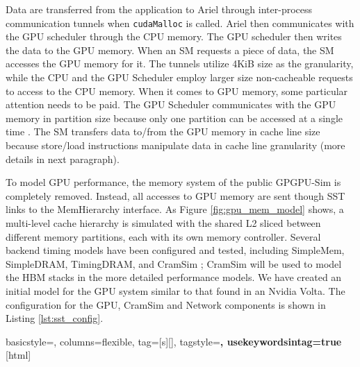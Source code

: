 Data are transferred from the application to Ariel through
inter-process communication tunnels when \texttt{cudaMalloc} is called. 
Ariel then communicates with the GPU scheduler through
the CPU memory. The GPU scheduler then writes the data to the GPU memory. When an SM
requests a piece of data, the SM accesses the GPU memory for it.
The tunnels utilize 4KiB size as the granularity, while the CPU and the GPU Scheduler
employ larger size non-cacheable requests to access to the CPU memory. When it comes to
GPU memory, some particular attention needs to be paid. The GPU Scheduler communicates with 
the GPU memory in partition size because only one partition can be accessed at a single time 
. The SM transfers data to/from the GPU memory in cache line size because store/load 
instructions manipulate data in cache line granularity (more details in next paragraph). 

To model GPU performance, the memory system of the public GPGPU-Sim is
completely removed. Instead, all accesses to GPU memory are sent though SST
links to the MemHierarchy interface. As Figure \ref{fig:gpu_mem_model} shows, a
multi-level cache hierarchy is simulated with the shared L2 sliced between
different memory partitions, each with its own memory controller. Several
backend timing models have been configured and tested, including SimpleMem,
SimpleDRAM, TimingDRAM, and CramSim \cite{healy2017}; CramSim will be used to
model the HBM stacks in the more detailed performance models. We have created an
initial model for the GPU system similar to that found in an Nvidia Volta. The
configuration for the GPU, CramSim and Network components is shown in Listing
\ref{lst:sst_config}.


{
  basicstyle={\small\ttfamily},
  columns=flexible,
  tag=[s]{[]},
  tagstyle=\color{dkgreen}\bfseries,
  usekeywordsintag=true
}[html]




